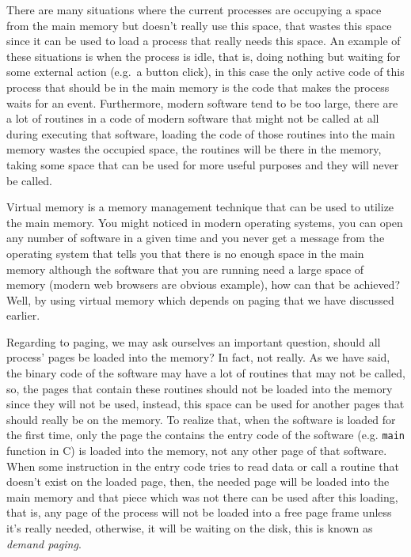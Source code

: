 There are many situations where the current processes are occupying a
space from the main memory but doesn't really use this space, that
wastes this space since it can be used to load a process that really
needs this space. An example of these situations is when the process is
idle, that is, doing nothing but waiting for some external action
(e.g.~a button click), in this case the only active code of this process
that should be in the main memory is the code that makes the process
waits for an event. Furthermore, modern software tend to be too large,
there are a lot of routines in a code of modern software that might not
be called at all during executing that software, loading the code of
those routines into the main memory wastes the occupied space, the
routines will be there in the memory, taking some space that can be used
for more useful purposes and they will never be called.

Virtual memory is a memory management technique that can be used to
utilize the main memory. You might noticed in modern operating systems,
you can open any number of software in a given time and you never get a
message from the operating system that tells you that there is no enough
space in the main memory although the software that you are running need
a large space of memory (modern web browsers are obvious example), how
can that be achieved? Well, by using virtual memory which depends on
paging that we have discussed earlier.

Regarding to paging, we may ask ourselves an important question, should
all process' pages be loaded into the memory? In fact, not really. As we
have said, the binary code of the software may have a lot of routines
that may not be called, so, the pages that contain these routines should
not be loaded into the memory since they will not be used, instead, this
space can be used for another pages that should really be on the memory.
To realize that, when the software is loaded for the first time, only
the page the contains the entry code of the software (e.g.
\lstinline!main! function in C) is loaded into the memory, not any other
page of that software. When some instruction in the entry code tries to
read data or call a routine that doesn't exist on the loaded page, then,
the needed page will be loaded into the main memory and that piece which
was not there can be used after this loading, that is, any page of the
process will not be loaded into a free page frame unless it's really
needed, otherwise, it will be waiting on the disk, this is known as
\emph{demand paging}.

